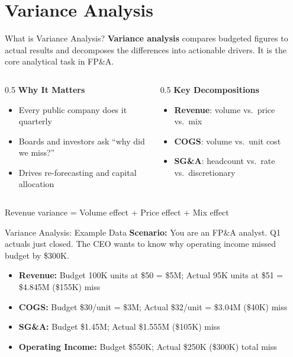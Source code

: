 \documentclass[aspectratio=169]{beamer}
\begin{document}
\section{Variance Analysis}

\begin{frame}{What is Variance Analysis?}
\textbf{Variance analysis} compares \alert{budgeted} figures to \alert{actual} results and decomposes the differences into actionable drivers. It is the core analytical task in FP\&A.
\vspace{0.3cm}
\begin{columns}[T]
\begin{column}{0.5\textwidth}
\textbf{Why It Matters}
\begin{itemize}\small
  \item Every public company does it quarterly
  \item Boards and investors ask ``why did we miss?''
  \item Drives re-forecasting and capital allocation
\end{itemize}
\end{column}
\begin{column}{0.5\textwidth}
\textbf{Key Decompositions}
\begin{itemize}\small
  \item \textbf{Revenue}: volume vs.\ price vs.\ mix
  \item \textbf{COGS}: volume vs.\ unit cost
  \item \textbf{SG\&A}: headcount vs.\ rate vs.\ discretionary
\end{itemize}
\end{column}
\end{columns}
\vspace{0.3cm}
Revenue variance = \alert{Volume effect} + \alert{Price effect} + \alert{Mix effect}
\end{frame}

\begin{frame}{Variance Analysis: Example Data}
\textbf{Scenario:} You are an FP\&A analyst. Q1 actuals just closed. The CEO wants to know why operating income missed budget by \$300K.
\vspace{0.3cm}
\begin{itemize}
  \item \textbf{Revenue:} Budget 100K units at \$50 = \$5M; Actual 95K units at \$51 = \$4.845M \quad \alert{(\$155K) miss}
  \item \textbf{COGS:} Budget \$30/unit = \$3M; Actual \$32/unit = \$3.04M \quad \alert{(\$40K) miss}
  \item \textbf{SG\&A:} Budget \$1.45M; Actual \$1.555M \quad \alert{(\$105K) miss}
  \item \textbf{Operating Income:} Budget \$550K; Actual \$250K \quad \alert{(\$300K) total miss}
\end{itemize}
\end{frame}
\end{document}
